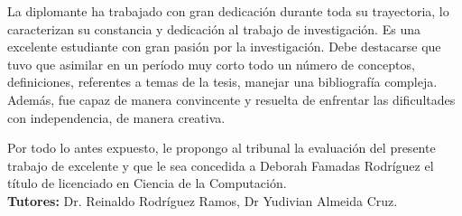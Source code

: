 \begin{opinion}
La diplomante ha trabajado con gran dedicación durante toda su trayectoria, lo caracterizan su constancia y dedicación al trabajo de investigación. Es una excelente estudiante con gran pasión por la investigación. Debe destacarse que tuvo que asimilar en un período muy corto todo un número de conceptos, definiciones, referentes a temas de la tesis, manejar una bibliografía compleja. Además, fue capaz de manera convincente y resuelta de enfrentar las dificultades con independencia, de manera creativa.

Por todo lo antes expuesto, le propongo al tribunal la evaluación del presente trabajo de excelente y que le sea concedida a Deborah Famadas Rodríguez el título de licenciado en Ciencia de la Computación. \\

\textbf{Tutores:} Dr. Reinaldo Rodríguez Ramos,
Dr Yudivian Almeida Cruz.

\end{opinion}